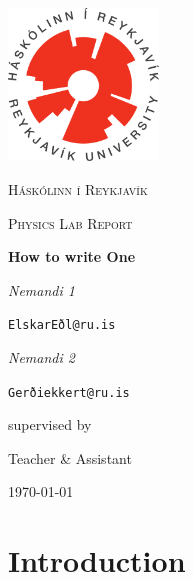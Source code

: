 \documentclass{scrartcl}
\begin{document}
\begin{titlepage}
	\centering
	\includegraphics[width=0.3\textwidth]{ru-logo-1.pdf}\par\vspace{1cm} %
	{\scshape\LARGE Háskólinn í Reykjavík \par} %
	\vspace{1cm}
	{\scshape\Large Physics Lab Report\par} %
	\vspace{1.5cm}
	{\huge\bfseries How to write One\par} %
	\vspace{2cm}
	{\Large\itshape Nemandi 1}\par %
	\texttt{ElskarEðl@ru.is}\par %
	\vspace{0.5cm}
	{\Large\itshape Nemandi 2}\par %
	\texttt{Gerðiekkert@ru.is}\par %
	\vfill
	supervised by\par %
	Teacher \& Assistant %
	\vfill

	{\large \today\par}
\end{titlepage}


\section{Introduction} %
\end{document}
